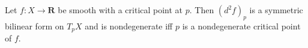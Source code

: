 Let $f: X \to \mathbf{R}$ be smooth with a critical point at $p$. Then $(d^2 f)_p$ is a symmetric bilinear form on $T_p X$ and is nondegenerate iff $p$ is a nondegenerate critical point of $f$.
